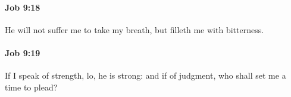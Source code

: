 		\paragraph{Job 9:18} %
			\label{JOB-9-18}

			He will not suffer me to take my breath, but filleth me with bitterness.


		\paragraph{Job 9:19} %
			\label{JOB-9-19}

			If I speak of strength, lo, he is strong: and if of judgment, who shall set me a time to plead?


